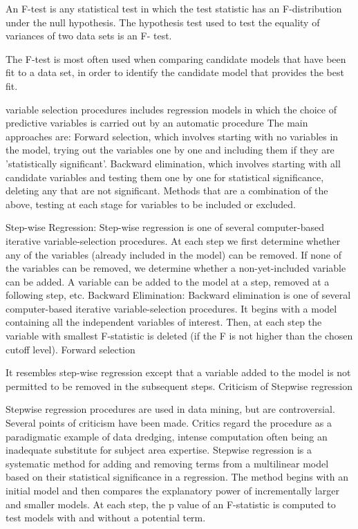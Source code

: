 
An F-test is any statistical test in which the test statistic has an F-distribution under the null hypothesis. The hypothesis test used to test the equality of variances of two data sets is an F- test.

The F-test is most often used when comparing candidate models that have been fit to a data set, in order to identify the candidate model that provides the best fit. 

variable selection procedures includes regression models in which the choice of predictive variables is carried out by an automatic procedure
The main approaches are:
Forward selection, which involves starting with no variables in the model, trying out the variables one by one and including them if they are 'statistically significant'.
Backward elimination, which involves starting with all candidate variables and testing them one by one for statistical significance, deleting any that are not significant.
Methods that are a combination of the above, testing at each stage for variables to be included or excluded.

Step-wise Regression:
Step-wise regression is one of several computer-based iterative variable-selection procedures. At each step we first determine whether any of the variables (already included in the model) can be removed. If none of the variables can be removed, we determine whether a non-yet-included variable can be added. A variable can be added to the model at a step, removed at a following step, etc.
Backward Elimination:
Backward elimination is one of several computer-based iterative variable-selection procedures. It begins with a model containing all the independent variables of interest. Then, at each step the variable with smallest F-statistic is deleted (if the F is not higher than the chosen cutoff level).
Forward selection 

It resembles step-wise regression except that a variable added to the model is not permitted to be removed in the subsequent steps.
Criticism of Stepwise regression

Stepwise regression procedures are used in data mining, but are controversial. Several points of criticism have been made.
Critics regard the procedure as a paradigmatic example of data dredging, intense computation often being an inadequate substitute for subject area expertise.
Stepwise regression is a systematic method for adding and removing terms from a multilinear model based on their statistical significance in a regression. The method begins with an initial model and then compares the explanatory power of incrementally larger and smaller models. At each step, the p value of an F-statistic is computed to test models with and without a potential term. 

